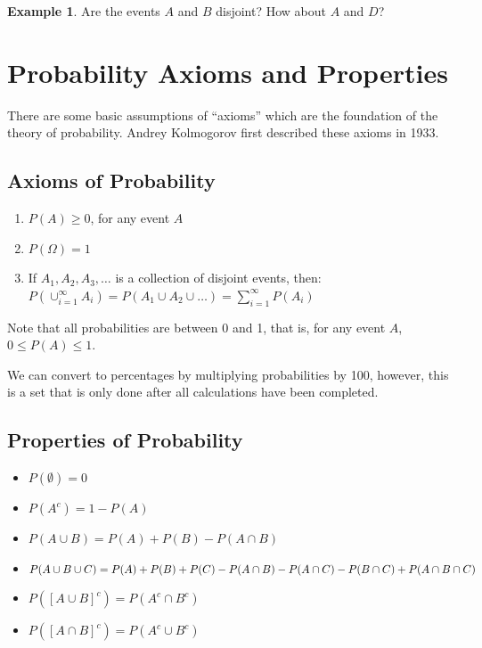\documentclass[
]{book}
\providecommand{\tightlist}{%
  \setlength{\itemsep}{0pt}\setlength{\parskip}{0pt}}
\theoremstyle{definition}
\theoremstyle{definition}
\newtheorem{example}{Example}[chapter]
\theoremstyle{definition}
\theoremstyle{definition}
\theoremstyle{remark}
\begin{document}
\begin{example}
Are the events \(A\) and \(B\) disjoint? How about \(A\) and \(D\)?
\end{example}

\hfill\break
\hfill\break
\hfill\break
\hfill\break
\hfill\break

\hypertarget{probability-axioms-and-properties}{%
\section{Probability Axioms and Properties}\label{probability-axioms-and-properties}}

There are some basic assumptions of ``axioms'' which are the foundation of the theory of probability. Andrey Kolmogorov first described these axioms in 1933.

\hypertarget{axioms-of-probability}{%
\subsection{Axioms of Probability}\label{axioms-of-probability}}

\begin{enumerate}
\def\labelenumi{\arabic{enumi}.}
\tightlist
\item
  \(P(A) \geq 0\), for any event \(A\)\\
\item
  \(P(\Omega) = 1\)\\
\item
  If \(A_1, A_2, A_3, \ldots\) is a collection of disjoint events, then:\\
  \(P(\cup_{i=1}^{\infty} A_i) = P(A_1 \cup A_2 \cup \ldots ) = \sum_{i=1}^{\infty} P(A_i)\)
\end{enumerate}

Note that all probabilities are between 0 and 1, that is, for any event \(A\), \(0 \leq P(A) \leq 1\).

We can convert to percentages by multiplying probabilities by 100, however, this is a set that is only done after all calculations have been completed.

\hypertarget{properties-of-probability}{%
\subsection{Properties of Probability}\label{properties-of-probability}}

\begin{itemize}
\item
  \(P(\emptyset) = 0\)\\
\item
  \(P(A^c) = 1 - P(A)\)
\item
  \(P(A \cup B) = P(A) + P(B) - P(A \cap B)\)
\item
  \(P(A \cup B \cup C) = \\ P(A) + P(B) + P(C) - P(A \cap B) - P(A \cap C) - P(B \cap C) + P(A \cap B \cap C)\)
\item
  \(P([A \cup B]^c) = P(A^c \cap B^c)\)
\item
  \(P([A \cap B]^c) = P(A^c \cup B^c)\)
\end{itemize}
\end{document}
